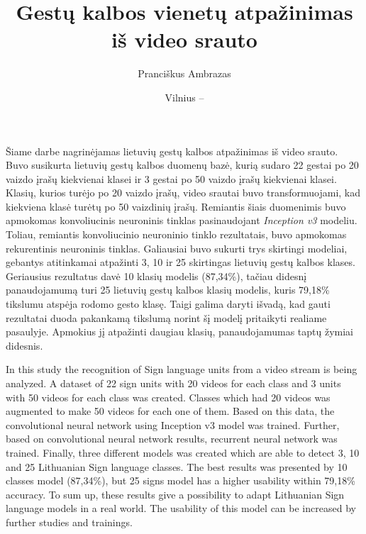 \documentclass{VUMIFPSbakalaurinis}
\title{Gestų kalbos vienetų atpažinimas iš video srauto}
\author{Pranciškus Ambrazas}
\date{Vilnius – \the\year}
\begin{document}
\maketitle



Šiame darbe nagrinėjamas lietuvių gestų kalbos atpažinimas iš video srauto. Buvo susikurta lietuvių gestų kalbos duomenų bazė, kurią sudaro 22 gestai po 20 vaizdo įrašų kiekvienai klasei ir 3 gestai po 50 vaizdo įrašų kiekvienai klasei. Klasių, kurios turėjo po 20 vaizdo įrašų, video srautai buvo transformuojami, kad kiekviena klasė turėtų po 50 vaizdinių įrašų. Remiantis šiais duomenimis buvo apmokomas konvoliucinis neuroninis tinklas pasinaudojant \textit{Inception v3} modeliu. Toliau, remiantis konvoliucinio neuroninio tinklo rezultatais, buvo apmokomas rekurentinis neuroninis tinklas. Galiausiai buvo sukurti trys skirtingi modeliai, gebantys atitinkamai atpažinti 3, 10 ir 25 skirtingas lietuvių gestų kalbos klases. Geriausius rezultatus davė 10 klasių modelis (87,34\%), tačiau didesnį panaudojamumą turi 25 lietuvių gestų kalbos klasių modelis, kuris 79,18\% tikslumu atspėja rodomo gesto klasę. Taigi galima daryti išvadą, kad gauti rezultatai duoda pakankamą tikslumą norint šį modelį pritaikyti realiame pasaulyje. Apmokius jį atpažinti daugiau klasių, panaudojamumas taptų žymiai didesnis.



In this study the recognition of Sign language units from a video stream is being analyzed. A dataset of 22 sign units with 20 videos for each class and 3 units with 50 videos for each class was created. Classes which had 20 videos was augmented to make 50 videos for each one of them. Based on this data, the convolutional neural network using Inception v3 model was trained. Further, based on convolutional neural network results, recurrent neural network was trained. Finally, three different models was created which are able to detect 3, 10 and 25 Lithuanian Sign language classes. The best results was presented by 10 classes model (87,34\%), but 25 signs model has a higher usability within 79,18\% accuracy. To sum up, these results give a possibility to adapt Lithuanian Sign language models in a real world. The usability of this model can be increased by further studies and trainings.
\end{document}
